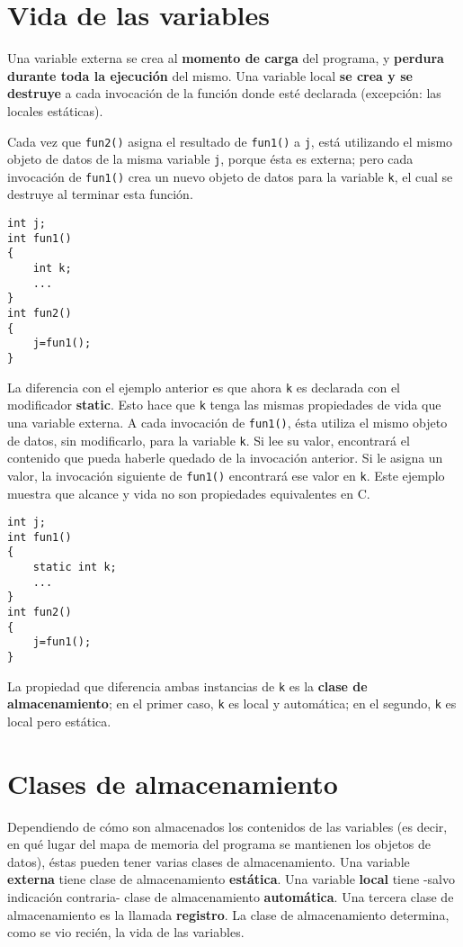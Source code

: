 \section{Vida de las variables}

Una variable externa se crea al \textbf{momento de carga} del programa, y \textbf{perdura durante toda la ejecución}
del mismo. Una variable local \textbf{se crea y se destruye} a cada invocación de la función donde esté
declarada (excepción: las locales estáticas).

\begin{ejemplo}
Cada vez que \texttt{fun2()} asigna el resultado de \texttt{fun1()} a \texttt{j}, está utilizando el mismo objeto de datos de la misma variable \texttt{j}, porque ésta es externa; pero cada invocación de \texttt{fun1()} crea un nuevo objeto de datos para la variable \texttt{k}, el cual se destruye al terminar esta función.
\begin{lstlisting}
int j;
int fun1()
{
	int k;
	...
}
int fun2()
{
	j=fun1();
}
\end{lstlisting}
\end{ejemplo}

\begin{ejemplo}

La diferencia con el ejemplo anterior es que ahora \texttt{k} es declarada con el modificador \textbf{static}. Esto hace
que \texttt{k} tenga las mismas propiedades de vida que una variable externa. A cada invocación de \texttt{fun1()},
ésta utiliza el mismo objeto de datos, sin modificarlo, para la variable \texttt{k}. Si lee su valor, encontrará el
contenido que pueda haberle quedado de la invocación anterior. Si le asigna un valor, la invocación siguiente de \texttt{fun1()}
encontrará ese valor en \texttt{k}. Este ejemplo muestra que alcance y vida no son propiedades equivalentes en
C. 
\begin{lstlisting}
int j;
int fun1()
{
	static int k;
	...
}
int fun2()
{
	j=fun1();
}
\end{lstlisting}
La propiedad que diferencia ambas instancias de \texttt{k} es la \textbf{clase de almacenamiento}; en el primer caso,
\texttt{k} es local y automática; en el segundo, \texttt{k} es local pero estática. 
\end{ejemplo}


\section{Clases de almacenamiento}
Dependiendo de cómo son almacenados los contenidos de las variables (es decir, en qué lugar del mapa de memoria del programa se mantienen los objetos de datos), éstas pueden tener varias clases de almacenamiento. Una variable \textbf{externa} tiene clase de almacenamiento \textbf{estática}. Una variable \textbf{local} tiene -salvo indicación contraria- clase de almacenamiento \textbf{automática}. Una tercera clase de almacenamiento es la llamada \textbf{registro}. La clase de almacenamiento determina, como se vio recién, la vida de las variables.

